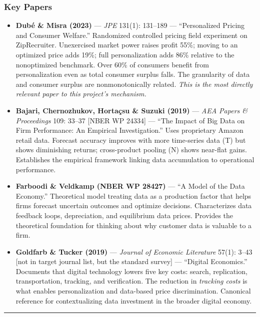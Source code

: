 \documentclass[
]{article}
\begin{document}
\hypertarget{key-papers}{%
\subsubsection{Key Papers}\label{key-papers}}

\begin{itemize}
\item
  \textbf{Dubé \& Misra (2023)} --- \emph{JPE} 131(1): 131--189 ---
  ``Personalized Pricing and Consumer Welfare.'' Randomized controlled
  pricing field experiment on ZipRecruiter. Unexercised market power
  raises profit 55\%; moving to an optimized price adds 19\%; full
  personalization adds 86\% relative to the nonoptimized benchmark. Over
  60\% of consumers benefit from personalization even as total consumer
  surplus falls. The granularity of data and consumer surplus are
  nonmonotonically related. \emph{This is the most directly relevant
  paper to this project's mechanism.}
\item
  \textbf{Bajari, Chernozhukov, Hortaçsu \& Suzuki (2019)} --- \emph{AEA
  Papers \& Proceedings} 109: 33--37 {[}NBER WP 24334{]} --- ``The
  Impact of Big Data on Firm Performance: An Empirical Investigation.''
  Uses proprietary Amazon retail data. Forecast accuracy improves with
  more time-series data (T) but shows diminishing returns; cross-product
  pooling (N) shows near-flat gains. Establishes the empirical framework
  linking data accumulation to operational performance.
\item
  \textbf{Farboodi \& Veldkamp (NBER WP 28427)} --- ``A Model of the
  Data Economy.'' Theoretical model treating data as a production factor
  that helps firms forecast uncertain outcomes and optimize decisions.
  Characterizes data feedback loops, depreciation, and equilibrium data
  prices. Provides the theoretical foundation for thinking about why
  customer data is valuable to a firm.
\item
  \textbf{Goldfarb \& Tucker (2019)} --- \emph{Journal of Economic
  Literature} 57(1): 3--43 {[}not in target journal list, but the
  standard survey{]} --- ``Digital Economics.'' Documents that digital
  technology lowers five key costs: search, replication, transportation,
  tracking, and verification. The reduction in \emph{tracking costs} is
  what enables personalization and data-based price discrimination.
  Canonical reference for contextualizing data investment in the broader
  digital economy.
\end{itemize}

\begin{center}\rule{0.5\linewidth}{0.5pt}\end{center}
\end{document}
